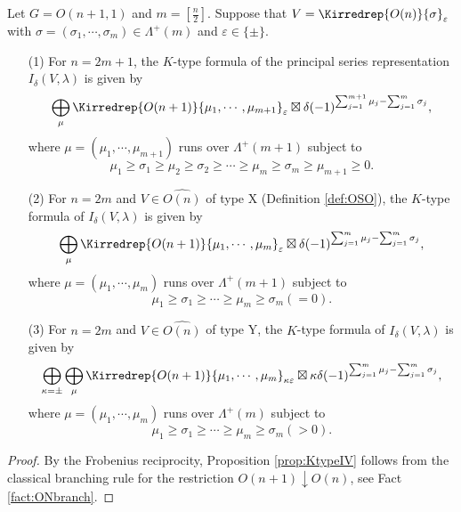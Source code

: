 \begin{proposition}
\label{prop:KtypeIV}
Let $G=O(n+1,1)$ and $m=[\frac n 2]$.  
Suppose that $V=\Kirredrep{O(n)}{\sigma}_{\varepsilon}$
 with $\sigma=(\sigma_1, \cdots,\sigma_m) \in \Lambda^+(m)$
 and $\varepsilon \in \{\pm\}$.  
\begin{enumerate}
\item[{\rm{(1)}}]
For $n=2m+1$, 
 the $K$-type formula 
 of the principal series representation 
 $I_{\delta}(V,\lambda)$ is given by
\[
  \bigoplus_{\mu} \Kirredrep{O(n+1)}{\mu_1, \cdots,\mu_{m+1}}_{\varepsilon}
  \boxtimes \delta(-1)^{\sum_{j=1}^{m+1} \mu_j - \sum_{j=1}^{m}\sigma_j},
\]
where $\mu=(\mu_1, \cdots,\mu_{m+1})$
 runs over $\Lambda^+(m+1)$ subject to 
\begin{equation}
\label{eqn:Kmuodd}
\mu_1 \ge \sigma_1 \ge \mu_2 \ge \sigma_2 \ge \cdots \ge \mu_m \ge \sigma_m 
\ge \mu_{m+1} \ge 0.  
\end{equation}

\item[{\rm{(2)}}]
For $n=2m$ and $V \in \widehat{O(n)}$ of type X
 (Definition \ref{def:OSO}), 
 the $K$-type formula 
 of $I_{\delta}(V,\lambda)$ is given by
\[
  \bigoplus_{\mu} \Kirredrep{O(n+1)}{\mu_1, \cdots,\mu_{m}}_{\varepsilon}
  \boxtimes \delta(-1)^{\sum_{j=1}^{m} \mu_j - \sum_{j=1}^{m}\sigma_j},
\]
where $\mu=(\mu_1, \cdots,\mu_{m})$
 runs over $\Lambda^+(m+1)$ subject to 
\begin{equation}
\label{eqn:Kmueven1}
\mu_1 \ge \sigma_1 \ge \cdots \ge \mu_m \ge \sigma_m 
(=0).  
\end{equation}

\item[{\rm{(3)}}]
For $n=2m$ and $V\in \widehat{O(n)}$ of type Y, 
 the $K$-type formula of $I_{\delta}(V,\lambda)$ is given by
\[
\bigoplus_{\kappa=\pm}
\bigoplus_{\mu} \Kirredrep{O(n+1)}{\mu_1, \cdots,\mu_{m}}_{\kappa\varepsilon}
  \boxtimes \kappa \delta(-1)^{\sum_{j=1}^{m} \mu_j - \sum_{j=1}^{m}\sigma_j},
\]
where $\mu=(\mu_1, \cdots,\mu_{m})$
 runs over $\Lambda^+(m)$ subject to 
\begin{equation}
\label{eqn:Kmueven2}
\mu_1 \ge \sigma_1 \ge \cdots \ge \mu_m \ge \sigma_m 
(>0).  
\end{equation}
\end{enumerate}
\end{proposition}

\begin{proof}
By the Frobenius reciprocity, 
Proposition \ref{prop:KtypeIV} follows from the classical
 branching rule for the restriction
 $O(n+1) \downarrow O(n)$, 
 see Fact \ref{fact:ONbranch}.  
\end{proof}

